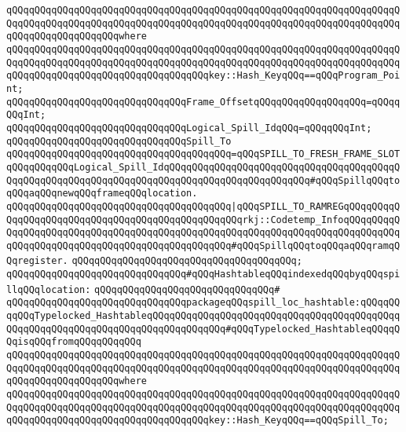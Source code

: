 \verb|qQQqqQQqqQQqqQQqqQQqqQQqqQQqqQQqqQQqqQQqqQQqqQQqqQQqqQQqqQQqqQQqqQQqqQQqqQQqqQQqqQQqqQQqqQQqqQQqqQQqqQQqqQQqqQQqqQQqqQQqqQQqqQQqqQQqqQQqqQQqqQQqqQQqqQQqqQQqqQQqwhere|\newline
\verb|qQQqqQQqqQQqqQQqqQQqqQQqqQQqqQQqqQQqqQQqqQQqqQQqqQQqqQQqqQQqqQQqqQQqqQQqqQQqqQQqqQQqqQQqqQQqqQQqqQQqqQQqqQQqqQQqqQQqqQQqqQQqqQQqqQQqqQQqqQQqqQQqqQQqqQQqqQQqqQQqqQQqqQQqqQQqqQQqkey::Hash_KeyqQQq==qQQqProgram_Point;|\newline
\newline
\verb|qQQqqQQqqQQqqQQqqQQqqQQqqQQqqQQqFrame_OffsetqQQqqQQqqQQqqQQqqQQq=qQQqqQQqInt;|\newline
\verb|qQQqqQQqqQQqqQQqqQQqqQQqqQQqqQQqLogical_Spill_IdqQQq=qQQqqQQqInt;|\newline
\newline
\verb|qQQqqQQqqQQqqQQqqQQqqQQqqQQqqQQqSpill_To|\newline
\verb|qQQqqQQqqQQqqQQqqQQqqQQqqQQqqQQqqQQqqQQq=qQQqSPILL_TO_FRESH_FRAME_SLOTqQQqqQQqqQQqLogical_Spill_IdqQQqqQQqqQQqqQQqqQQqqQQqqQQqqQQqqQQqqQQqqQQqqQQqqQQqqQQqqQQqqQQqqQQqqQQqqQQqqQQqqQQqqQQqqQQqqQQq#qQQqSpillqQQqtoqQQqaqQQqnewqQQqframeqQQqlocation.|\newline
\verb|qQQqqQQqqQQqqQQqqQQqqQQqqQQqqQQqqQQqqQQq|\verb#|qQQqSPILL_TO_RAMREGqQQqqQQqqQQqqQQqqQQqqQQqqQQqqQQqqQQqqQQqqQQqqQQqqQQqrkj::Codetemp_InfoqQQqqQQqqQQqqQQqqQQqqQQqqQQqqQQqqQQqqQQqqQQqqQQqqQQqqQQqqQQqqQQqqQQqqQQqqQQqqQQqqQQqqQQqqQQqqQQqqQQqqQQqqQQqqQQqqQQqqQQq#\verb|#qQQqSpillqQQqtoqQQqaqQQqramqQQqregister.|\newline
\verb|qQQqqQQqqQQqqQQqqQQqqQQqqQQqqQQqqQQqqQQq;|\newline
\newline
\verb|qQQqqQQqqQQqqQQqqQQqqQQqqQQqqQQq#qQQqHashtableqQQqindexedqQQqbyqQQqspillqQQqlocation:|\newline
\verb|qQQqqQQqqQQqqQQqqQQqqQQqqQQqqQQq#|\newline
\verb|qQQqqQQqqQQqqQQqqQQqqQQqqQQqqQQqpackageqQQqspill_loc_hashtable:qQQqqQQqqQQqTypelocked_HashtableqQQqqQQqqQQqqQQqqQQqqQQqqQQqqQQqqQQqqQQqqQQqqQQqqQQqqQQqqQQqqQQqqQQqqQQqqQQqqQQqqQQq#qQQqTypelocked_HashtableqQQqqQQqisqQQqfromqQQqqQQqqQQq|\newline
\verb|qQQqqQQqqQQqqQQqqQQqqQQqqQQqqQQqqQQqqQQqqQQqqQQqqQQqqQQqqQQqqQQqqQQqqQQqqQQqqQQqqQQqqQQqqQQqqQQqqQQqqQQqqQQqqQQqqQQqqQQqqQQqqQQqqQQqqQQqqQQqqQQqqQQqqQQqqQQqqQQqwhere|\newline
\verb|qQQqqQQqqQQqqQQqqQQqqQQqqQQqqQQqqQQqqQQqqQQqqQQqqQQqqQQqqQQqqQQqqQQqqQQqqQQqqQQqqQQqqQQqqQQqqQQqqQQqqQQqqQQqqQQqqQQqqQQqqQQqqQQqqQQqqQQqqQQqqQQqqQQqqQQqqQQqqQQqqQQqqQQqqQQqqQQqkey::Hash_KeyqQQq==qQQqSpill_To;|\newline
